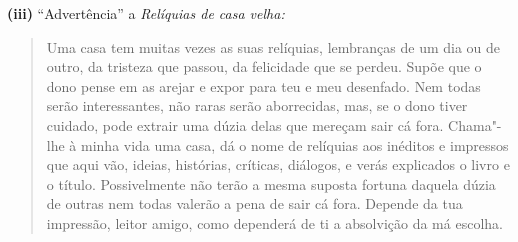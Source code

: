 \bigskip

\textbf{(iii)} ``Advertência'' a \emph{Relíquias de casa velha: }

\begin{quote}
Uma casa tem muitas vezes as suas relíquias, lembranças de um dia ou de
outro, da tristeza que passou, da felicidade que se perdeu. Supõe que o
dono pense em as arejar e expor para teu e meu desenfado. Nem todas
serão interessantes, não raras serão aborrecidas, mas, se o dono tiver
cuidado, pode extrair uma dúzia delas que mereçam sair cá fora.
Chama"-lhe à minha vida uma casa, dá o nome de relíquias aos inéditos e
impressos que aqui vão, ideias, histórias, críticas, diálogos, e verás
explicados o livro e o título. Possivelmente não terão a mesma suposta
fortuna daquela dúzia de outras nem todas valerão a pena de sair cá
fora. Depende da tua impressão, leitor amigo, como dependerá de ti a
absolvição da má escolha.
\end{quote}